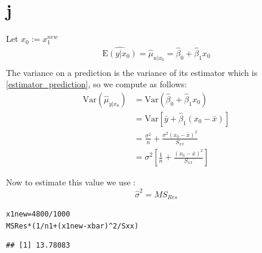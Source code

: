 \documentclass{article}\usepackage[]{graphicx}\usepackage[]{color}
\makeatletter
\newcommand{\hlnum}[1]{\textcolor[rgb]{0.686,0.059,0.569}{#1}}%
\newcommand{\hlopt}[1]{\textcolor[rgb]{0,0,0}{#1}}%
\newcommand{\hlstd}[1]{\textcolor[rgb]{0.345,0.345,0.345}{#1}}%
\newcommand{\hlkwb}[1]{\textcolor[rgb]{0.69,0.353,0.396}{#1}}%
\newenvironment{kframe}{%
 \def\at@end@of@kframe{}%
 \ifinner\ifhmode%
  \def\at@end@of@kframe{\end{minipage}}%
  \begin{minipage}{\columnwidth}%
 \fi\fi%
 \def\FrameCommand##1{\hskip\@totalleftmargin \hskip-\fboxsep
 \colorbox{shadecolor}{##1}\hskip-\fboxsep
     \hskip-\linewidth \hskip-\@totalleftmargin \hskip\columnwidth}%
 \MakeFramed {\advance\hsize-\width
   \@totalleftmargin\z@ \linewidth\hsize
   \@setminipage}}%
 {\par\unskip\endMakeFramed%
 \at@end@of@kframe}
\newenvironment{knitrout}{}{} %
\newcommand{\E}{\mathrm{E}}
\newcommand{\Var}{\mathrm{Var}}
\makeatother
\begin{document}
\section*{j}
	Let $x_0 :=x_1^{new} $
	\begin{align}
		\widehat{\E(y\vert x_0)} = \hat \mu_{u\vert x_0} = \hat \beta_0 +\hat \beta_1 x_0 \label{estimator_prediction}\\
	\end{align}
	The variance on a prediction is the variance of its estimator which is \ref{estimator_prediction}, so we compute as follows:
	\begin{align}
		\Var(\hat \mu_{y\vert x_0}) &= \Var(\hat \beta_0 + \hat \beta_1 x_0)\\[2ex]
		&= \Var [\bar y + \hat \beta_1 (x_0 - \bar x)]\\[2ex]
		&= \frac{\sigma^2}{n} + \frac{\sigma^2 (x_0-\bar x)^2}{S_{xx}}\\[2ex]
		&= \sigma^2 \left[\frac{1}{n} + \frac{(x_0-\bar x )^2}{S_{xx}}\right]
	\end{align}
	
	Now to estimate this value we use :
	\[\hat \sigma ^2 = MS_{Res}\]
	
	
	
\begin{knitrout}
\color{fgcolor}\begin{kframe}
\begin{alltt}
\hlstd{x1new} \hlkwb{=} \hlnum{4800}\hlopt{/}\hlnum{1000}
\hlstd{MSRes}\hlopt{*}\hlstd{(}\hlnum{1}\hlopt{/}\hlstd{n1}  \hlopt{+} \hlstd{(x1new} \hlopt{-} \hlstd{xbar)}\hlopt{^}\hlnum{2}\hlopt{/}\hlstd{Sxx)}
\end{alltt}
\begin{verbatim}
## [1] 13.78083
\end{verbatim}
\end{kframe}
\end{knitrout}











  
 
\end{document}
